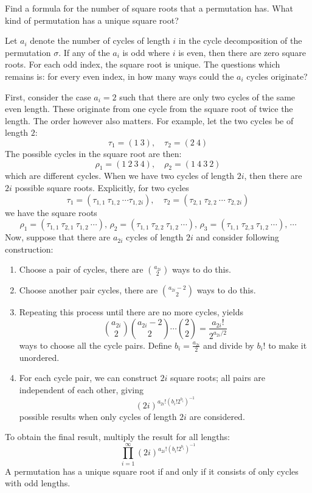 \begin{exercise}
    Find a formula for the number of square roots that a permutation has. What kind of permutation has a unique square root?
\end{exercise}
\begin{solution}
    Let $a_i$ denote the number of cycles of length $i$ in the cycle decomposition of the permutation $\sigma$. If any of the $a_i$ is odd where $i$ is even, then there are zero square roots. For each odd index, the square root is unique. The questions which remains is: for every even index, in how many ways could the $a_i$ cycles originate?

    First, consider the case $a_i = 2$ such that there are only two cycles of the same even length. These originate from one cycle from the square root of twice the length. The order however also matters. For example, let the two cycles be of length $2$:
    \[
        \tau_1 = (1 \ 3), \quad \tau_2 = (2 \ 4)
    \]
    The possible cycles in the square root are then:
    \[
        \rho_1 = (1 \ 2 \ 3 \ 4), \quad \rho_2 = (1 \ 4 \ 3 \ 2)
    \]
    which are different cycles. When we have two cycles of length $2i$, then there are $2i$ possible square roots. Explicitly, for two cycles
    \[
        \tau_1 = (\tau_{1,1} \ \tau_{1,2} \ \cdots \tau_{1,2i}), \quad \tau_2 = (\tau_{2,1} \ \tau_{2,2} \ \cdots \ \tau_{2,2i})
    \]
    we have the square roots
    \[
        \rho_1 = (\tau_{1,1} \ \tau_{2,1} \ \tau_{1,2} \ \cdots), \, \rho_2 = (\tau_{1,1} \ \tau_{2,2} \ \tau_{1,2} \ \cdots), \, \rho_3 = (\tau_{1,1} \ \tau_{2,3} \ \tau_{1,2} \ \cdots),\, \cdots
    \]
    Now, suppose that there are $a_{2i}$ cycles of length $2i$ and consider following construction:
    \begin{enumerate}[label=(\roman*)]
        \item Choose a pair of cycles, there are $\binom{a_{2i}}{2}$ ways to do this.
        \item Choose another pair cycles, there are $\binom{a_{2i} - 2}{2}$ ways to do this.
        \item Repeating this process until there are no more cycles, yields
        \[
            \binom{a_{2i}}{2} \binom{a_{2i} - 2}{2} \cdots \binom{2}{2} = \frac{a_{2i}!}{2^{a_{2i}/2}}
        \]
        ways to choose all the cycle pairs. Define $b_i = \frac{a_{2i}}{2}$ and divide by $b_i!$ to make it unordered.
        \item For each cycle pair, we can construct $2i$ square roots; all pairs are independent of each other, giving
        \[
            (2i)^{a_{2i}!\left(b_i!2^{b_i}\right)^{-1}}
        \]
        possible results when only cycles of length $2i$ are considered.
    \end{enumerate}
    To obtain the final result, multiply the result for all lengths:
    \[
        \prod_{i=1}^\infty (2i)^{a_{2i}!\left(b_i!2^{b_i}\right)^{-1}}
    \]
    A permutation has a unique square root if and only if it consists of only cycles with odd lengths.
\end{solution}

